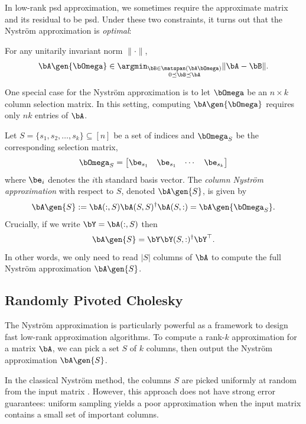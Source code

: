 In low-rank psd approximation, we sometimes require the approximate matrix and its residual to be psd. Under these two constraints, it turns out that the Nystr\"om approximation is \textit{optimal}:

\begin{theorem}{\cite{epperly_low-rank_2022}} 
\label{thm:nystrom-opt}
For any unitarily invariant norm $\|\cdot\|$,
\[\bA\gen{\bOmega}\in\argmin_{\substack{\bB\in\matspan(\bA\bOmega)\\0\preceq \bB\preceq\bA}} \|\bA - \bB\|.\]
\end{theorem}

One special case for the Nystr\"om approximation is to let $\bOmega$ be an $n\times k$ column selection matrix. In this setting, computing $\bA\gen{\bOmega}$ requires only $nk$ entries of $\bA$.

\begin{definition}
    Let $S = \{s_1, s_2,\ldots, s_k\}\subseteq [n]$ be a set of indices and $\bOmega_S$ be the corresponding selection matrix,
    \[\bOmega_S = \begin{bmatrix}
        \be_{s_1} & \be_{s_1} & \cdots & \be_{s_k}
    \end{bmatrix}\]
    where $\be_i$ denotes the $i$th standard basis vector. The \textit{column Nystr\"om approximation} with respect to $S$, denoted $\bA\gen{S}$, is given by
    \[\bA\gen{S} := \bA(:,S)\bA(S,S)^\dagger\bA(S,:) = \bA\gen{\bOmega_S}.\]
Crucially, if we write $\bY = \bA(:, S)$ then 
\[\bA\gen{S} = \bY\bY(S, :)^\dagger\bY^\top.\]
In other words, we only need to read $|S|$ columns of $\bA$ to compute the full Nystr\"om approximation $\bA\gen{S}$.

\end{definition}


\subsection{Randomly Pivoted Cholesky}
The Nystr\"om approximation is particularly powerful as a framework to design fast low-rank approximation algorithms. 
To compute a rank-$k$ approximation for a matrix $\bA$, we can pick a set $S$ of $k$ columns, then output the Nystr\"om approximation $\bA\gen{S}$. 

In the classical Nystr\"om method, the columns $S$ are picked uniformly at random from the input matrix \cite{williams_using_2000, drineas_nystrom_2005}. However, this approach does not have strong error guarantees: uniform sampling yields a poor approximation when the input matrix contains a small set of important columns. 

